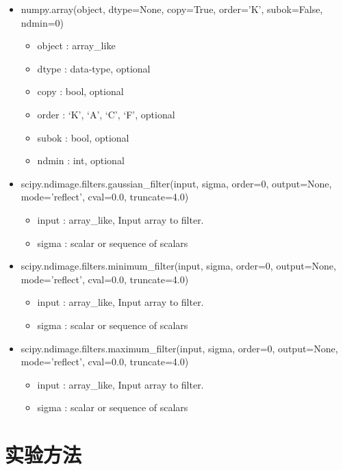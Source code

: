 \documentclass[11pt]{ctexart}
\begin{document}
    \begin{itemize}
    \item numpy.array(object, dtype=None, copy=True, order='K', subok=False, ndmin=0)
    \begin{itemize}
        \item object : array\_like
        \item dtype : data-type, optional
        \item copy : bool, optional
        \item order : {‘K’, ‘A’, ‘C’, ‘F’}, optional
        \item subok : bool, optional
        \item ndmin : int, optional
    \end{itemize}

    \item scipy.ndimage.filters.gaussian\_filter(input, sigma, order=0, output=None, mode='reflect', cval=0.0, truncate=4.0)
    \begin{itemize}
        \item input : array\_like, Input array to filter.
        \item sigma : scalar or sequence of scalars
    \end{itemize}
   
   
   \item scipy.ndimage.filters.minimum\_filter(input, sigma, order=0, output=None, mode='reflect', cval=0.0, truncate=4.0)
    \begin{itemize}
        \item input : array\_like, Input array to filter.
        \item sigma : scalar or sequence of scalars
    \end{itemize}

\item scipy.ndimage.filters.maximum\_filter(input, sigma, order=0, output=None, mode='reflect', cval=0.0, truncate=4.0)
    \begin{itemize}
        \item input : array\_like, Input array to filter.
        \item sigma : scalar or sequence of scalars
    \end{itemize}
\end{itemize}

\section{实验方法}
\end{document}
